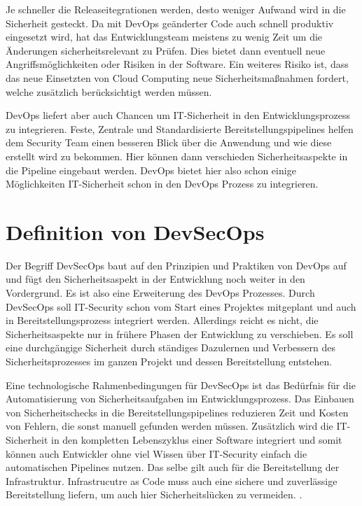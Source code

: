 Je schneller die Releaseitegrationen werden, desto weniger Aufwand wird in die Sicherheit gesteckt. Da mit DevOps geänderter Code auch schnell produktiv eingesetzt wird, hat das Entwicklungsteam meistens zu wenig Zeit um die Änderungen sicherheitsrelevant zu Prüfen. Dies bietet dann eventuell neue Angriffsmöglichkeiten oder Risiken in der Software.
Ein weiteres Risiko ist, dass das neue Einsetzten von Cloud Computing neue Sicherheitsmaßnahmen fordert, welche zusätzlich berücksichtigt werden müssen.


DevOps liefert aber auch Chancen um IT-Sicherheit in den Entwicklungsprozess zu integrieren.
Feste, Zentrale und Standardisierte Bereitstellungspipelines helfen dem Security Team einen besseren Blick über die Anwendung und wie diese erstellt wird zu bekommen. Hier können dann verschieden Sicherheitsaspekte in die Pipeline eingebaut werden. DevOps bietet hier also schon einige Möglichkeiten IT-Sicherheit schon in den DevOps Prozess zu integrieren. \cite{grey}

\section{Definition von DevSecOps}
Der Begriff DevSecOps baut auf den Prinzipien und Praktiken von DevOps auf und fügt den Sicherheitsaspekt in der Entwicklung noch weiter in den Vordergrund. Es ist also eine Erweiterung des DevOps Prozesses. Durch DevSecOps soll IT-Security schon vom Start eines Projektes mitgeplant und auch in Bereitstellungsprozess integriert werden. Allerdings reicht es nicht, die Sicherheitsaspekte nur in frühere Phasen der Entwicklung zu verschieben. Es soll eine durchgängige Sicherheit durch ständiges Dazulernen und Verbessern des Sicherheitsprozesses im ganzen Projekt und dessen Bereitstellung entstehen. \cite{grey}

Eine technologische Rahmenbedingungen für DevSecOps ist das Bedürfnis für die Automatisierung von Sicherheitsaufgaben im Entwicklungsprozess. Das Einbauen von Sicherheitschecks in die Bereitstellungspipelines reduzieren Zeit und Kosten von Fehlern, die sonst manuell gefunden werden müssen. Zusätzlich wird die IT-Sicherheit in den kompletten Lebenszyklus einer Software integriert und somit können auch Entwickler ohne viel Wissen über IT-Security einfach die automatischen Pipelines nutzen. Das selbe gilt auch für die Bereitstellung der Infrastruktur. Infrastrucutre as Code muss auch eine sichere und zuverlässige Bereitstellung liefern, um auch hier Sicherheitslücken zu vermeiden. \cite{grey}.

